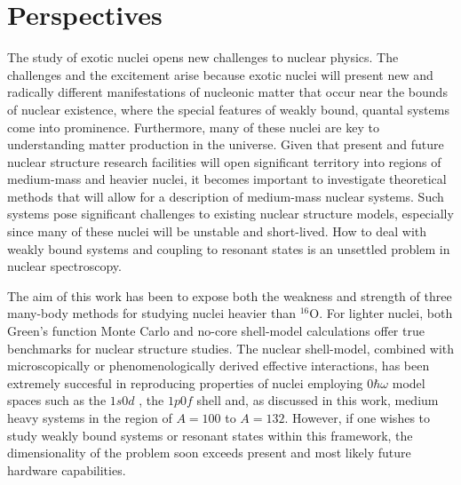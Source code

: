 \documentclass[twoside,12pt]{article}
\begin{document}
\section{Perspectives}\label{sec:sec8}

The study of exotic nuclei opens new 
challenges to nuclear physics. 
The challenges and the excitement arise 
because exotic nuclei will present new and 
radically different manifestations of nucleonic matter 
that occur near the bounds of nuclear existence, 
where the special features of weakly bound, quantal systems 
come into prominence. Furthermore, many of these
nuclei are key to understanding matter production in the universe.
Given that present and future nuclear structure research facilities
will open significant
territory into regions of medium-mass and heavier nuclei,
it becomes important to investigate theoretical methods that will allow
for a description of medium-mass nuclear systems. 
Such systems pose significant
challenges to existing nuclear structure models, especially since many of
these nuclei will be unstable and short-lived. How to deal with weakly
bound systems and coupling to resonant states is an unsettled problem in
nuclear spectroscopy. 

The aim of this work has been to expose both 
the weakness and strength of three many-body 
methods for studying nuclei heavier than $^{16}$O. 
For lighter nuclei, both Green's function 
Monte Carlo \cite{vijay,bob1,bob2,bob3} and no-core shell-model calculations 
\cite{bruce1,bruce2,bruce3,petr_erich2002,petr_erich2003}
offer true benchmarks for nuclear structure studies.
The nuclear shell-model, combined with microscopically or phenomenologically 
derived effective interactions, has been extremely succesful in reproducing 
properties of nuclei 
employing $0\hbar\omega$ model spaces such as the $1s0d$ \cite{alex},
the $1p0f$ shell \cite{taka1,etienne6} and, as discussed in 
this work, medium heavy systems
in the region of $A=100$ to $A=132$. However, 
if one wishes to study weakly bound systems
or resonant states within this framework, the dimensionality 
of the problem soon exceeds
present and most likely future hardware capabilities. 
\end{document}
